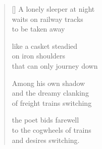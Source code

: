 \documentclass[14pt]{extbook}
\newcommand{\clearemptydoublepage}{\newpage{\pagestyle{empty}\cleardoublepage}}
\newcommand*{\centeredornament}{\centerline{\pgfornament[width=6cm]{88}}}
\begin{document}

\newpage

\vspace*{-15mm}
\centeredornament
\vspace*{-7mm}


\settowidth{\versewidth}{that can only journey down}

\begin{verse}[\versewidth]
  A lonely sleeper at night \\
  waits on railway tracks \\
  to be taken away

  like a casket steadied \\
  on iron shoulders \\
  that can only journey down

  Among his own shadow \\
  and the dreamy clanking \\
  of freight trains switching

  the poet bids farewell \\
  to the cogwheels of trains \\
  and desires switching.
\end{verse}


\thispagestyle{empty} \ \clearemptydoublepage
\thispagestyle{empty} \ \clearemptydoublepage
\end{document}
